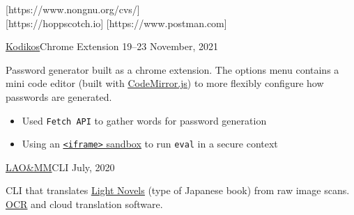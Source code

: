 \documentclass[10pt,a4paper,ragged2e,withhyper]{altacv}
\begin{document}
\begin{paracol}{2}
		[https://www.nongnu.org/cvs/]
		 \\ %
		[https://hoppscotch.io]
		[https://www.postman.com]
		 \\ %



		\cvevent
		{\href{https://github.com/jaacko-torus/kodikos/}{\uline{Kodikos}}{\hr}Chrome Extension}
		{{\CVTagHTMLCSS}{\CVTagJavaScript}}
		{19--23 November, 2021}{}
		\vspace{-0.3cm}
		\begin{justify}
			Password generator built as a chrome extension. The options menu contains a mini code editor (built with \href{https://codemirror.net/}{\uline{CodeMirror.js}}) to more flexibly configure how passwords are generated.
		\end{justify}
		\vspace{-0.2cm}
		\smallskip
		\begin{itemize}
			\item Used \texttt{Fetch API} to gather words for password generation
			\item Using an \href{https://developer.mozilla.org/en-US/docs/Web/HTTP/Headers/Content-Security-Policy/sandbox/}{\uline{\texttt{<iframe>} sandbox}} to run \texttt{eval} in a secure context
		\end{itemize}

		\divider

		\cvevent
		{\href{https://github.com/jaacko-torus/lao-mm/}{\uline{LAO\&MM}}{\hr}CLI}
		{{\CVTagRuby}{\CVTagOCRA}}
		{July, 2020}{}
		\vspace{-0.3cm}
		\begin{justify}
			CLI that translates \href{https://en.wikipedia.org/wiki/Light_novel}{\uline{Light Novels}} (type of Japanese book) from raw image scans. \href{http://capture2text.sourceforge.net/}{\uline{OCR}} and cloud translation software.
		\end{justify}

		\divider


\end{paracol}
\end{document}

